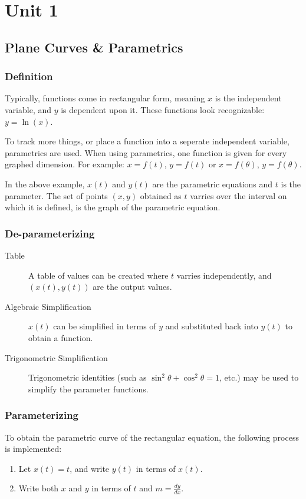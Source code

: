 \chapter{Unit 1}
\section{Plane Curves \& Parametrics}
\subsection{Definition}
Typically, functions come in rectangular form, meaning $x$ is the independent
variable, and $y$ is dependent upon it. These functions look recognizable:
$y=\ln(x)$.

To track more things, or place a function into a seperate independent variable,
parametrics are used. When using parametrics, one function is given for every
graphed dimension. For example: $x=f(t)$, $y=f(t)$ or $x=f(\theta)$,
$y=f(\theta)$.

In the above example, $x(t)$ and $y(t)$ are the parametric equations and $t$ is
the parameter. The set of points $(x, y)$ obtained as $t$ varries over the
interval on which it is defined, is the graph of the parametric equation.

\subsection{De-parameterizing}
\begin{description}
  \item[Table] A table of values can be created where $t$ varries independently,
    and $(x(t), y(t))$ are the output values.
  \item[Algebraic Simplification] $x(t)$ can be simplified in terms of $y$ and
    substituted back into $y(t)$ to obtain a function.
  \item[Trigonometric Simplification] Trigonometric identities (such as
    $\sin^2\theta + \cos^2\theta = 1$, etc.) may be used to simplify the
    parameter functions.
\end{description}

\subsection{Parameterizing}
To obtain the parametric curve of the rectangular equation, the
following process is implemented:

\begin{enumerate}
  \item Let $x(t) = t$, and write $y(t)$ in terms of $x(t)$.
  \item Write both $x$ and $y$ in terms of $t$ and $m=\frac{dy}{dx}$.
\end{enumerate}

